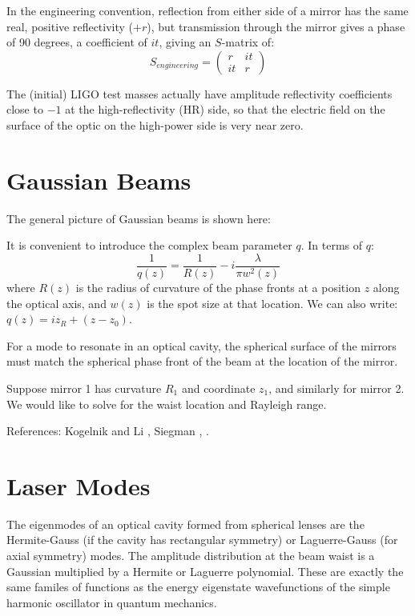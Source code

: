In the engineering convention, reflection from either side of a mirror
has the same real, positive reflectivity ($+r$), but transmission
through the mirror gives a phase of 90 degrees, a coefficient of $it$, 
giving an $S$-matrix of:
%
\begin{equation}
S_{engineering}=\left(\begin{array}{cc}
 r & it\\
it & r
\end{array}\right)
\label{eq:Smatrix-engr}
\end{equation}

The (initial) LIGO test masses actually have amplitude reflectivity
coefficients close to $-1$ at the high-reflectivity (HR) side, so
that the electric field on the surface of the optic on the high-power
side is very near zero.%

\section{Gaussian Beams}

The general picture of Gaussian beams is shown here:

It is convenient to introduce the complex beam parameter $q$.  In terms of $q$:
\begin{equation}
\frac{1}{q(z)} = \frac{1}{R(z)} - i \frac{\lambda}{\pi w^2(z)}
\end{equation}
where $R(z)$ is the radius of curvature of the phase fronts at a
position $z$ along the optical axis, and $w(z)$ is the spot size at
that location.  We can also write:
$q(z) = i z_R + (z - z_0)$.

For a mode to resonate in an optical cavity, the spherical surface of
the mirrors must match the spherical phase front of the beam at the
location of the mirror.

Suppose mirror 1 has curvature $R_1$ and coordinate $z_1$, and
similarly for mirror 2.  We would like to solve for the waist location
and Rayleigh range.

References: Kogelnik and Li \cite{Kogelnik1966Laser}, Siegman \cite{Siegman1990Lasers}, \cite{Rudiger1998Phase,Fox1961Resonant}.

\section{Laser Modes}

The eigenmodes of an optical cavity formed from spherical lenses are
the Hermite-Gauss (if the cavity has rectangular symmetry) or
Laguerre-Gauss (for axial symmetry) modes.  The amplitude distribution
at the beam waist is a Gaussian multiplied by a Hermite or Laguerre
polynomial.  These are exactly the same familes of functions as the
energy eigenstate wavefunctions of the simple harmonic oscillator in
quantum mechanics.

